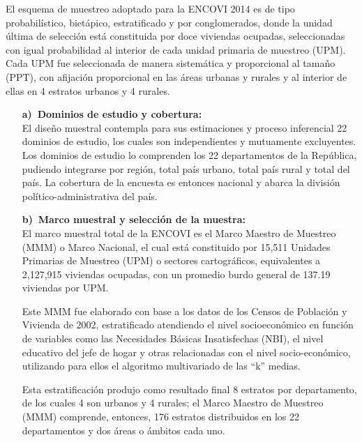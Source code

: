 \appendix


$\ $\\[-2cm]

El esquema de muestreo adoptado para la ENCOVI 2014 es de tipo probabilístico, bietápico, estratificado y por conglomerados, donde la unidad última de selección está constituida por doce viviendas ocupadas, seleccionadas con igual probabilidad al interior de cada unidad primaria de muestreo (UPM). Cada UPM fue seleccionada de manera sistemática y proporcional al tamaño (PPT), con afijación proporcional en las áreas urbanas y rurales y al interior de ellas en 4 estratos urbanos y 4 rurales.

\begin{itemize}
	\itemsep 16pt
	\item [\large\textbf{a)}$\ $]	\textbf{\large Dominios de estudio  y cobertura: }\\[3mm]
	El diseño muestral contempla para sus estimaciones y proceso inferencial 22 dominios de estudio, los cuales son independientes y mutuamente excluyentes. Los dominios de estudio lo comprenden los 22 departamentos de la República, pudiendo integrarse por región, total país urbano, total país rural y total del país. La cobertura de la encuesta es entonces nacional y abarca la división político-administrativa del país.
	
	
	
	\item[\large\textbf{b)}$\ $]	\textbf{\large Marco muestral y selección de la muestra:} \\[3mm]
	El marco muestral total de la ENCOVI es el Marco Maestro de Muestreo (MMM) o Marco Nacional, el cual está constituido por 15,511 Unidades Primarias de Muestreo (UPM) o sectores cartográficos, equivalentes a 2,127,915 viviendas ocupadas, con un promedio burdo general de 137.19 viviendas por UPM.
	
	Este MMM fue elaborado con base a los datos de los Censos de  Población y Vivienda de 2002,  estratificado atendiendo el nivel socioeconómico en función de variables como  las Necesidades Básicas Insatisfechas (NBI), el nivel educativo del jefe de hogar y otras relacionadas con el nivel socio-económico, utilizando para ellos el algoritmo multivariado de las “k” medias. 
	
	Esta estratificación produjo como resultado final 8 estratos por departamento, de los cuales 4 son urbanos y 4 rurales; el Marco Maestro de Muestreo (MMM) comprende, entonces, 176 estratos distribuidos en los 22 departamentos y dos áreas o ámbitos cada uno. 
	

\end{itemize}
